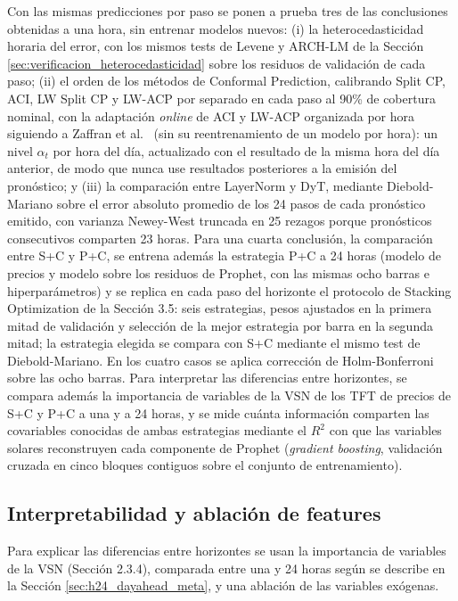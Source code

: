 Con las mismas predicciones por paso se ponen a prueba tres de las conclusiones obtenidas a una hora, sin entrenar modelos nuevos: (i) la heterocedasticidad horaria del error, con los mismos tests de Levene y ARCH-LM de la Sección \ref{sec:verificacion_heterocedasticidad} sobre los residuos de validación de cada paso; (ii) el orden de los métodos de Conformal Prediction, calibrando Split CP, ACI, LW Split CP y LW-ACP por separado en cada paso al 90\% de cobertura nominal, con la adaptación \textit{online} de ACI y LW-ACP organizada por hora siguiendo a Zaffran et al.\ \cite{ZaffranICML2022} (sin su reentrenamiento de un modelo por hora): un nivel $\alpha_t$ por hora del día, actualizado con el resultado de la misma hora del día anterior, de modo que nunca use resultados posteriores a la emisión del pronóstico; y (iii) la comparación entre LayerNorm y DyT, mediante Diebold-Mariano sobre el error absoluto promedio de los 24 pasos de cada pronóstico emitido, con varianza Newey-West truncada en 25 rezagos porque pronósticos consecutivos comparten 23 horas. Para una cuarta conclusión, la comparación entre S+C y P+C, se entrena además la estrategia P+C a 24 horas (modelo de precios y modelo sobre los residuos de Prophet, con las mismas ocho barras e hiperparámetros) y se replica en cada paso del horizonte el protocolo de Stacking Optimization de la Sección 3.5: seis estrategias, pesos ajustados en la primera mitad de validación y selección de la mejor estrategia por barra en la segunda mitad; la estrategia elegida se compara con S+C mediante el mismo test de Diebold-Mariano. En los cuatro casos se aplica corrección de Holm-Bonferroni sobre las ocho barras. Para interpretar las diferencias entre horizontes, se compara además la importancia de variables de la VSN de los TFT de precios de S+C y P+C a una y a 24 horas, y se mide cuánta información comparten las covariables conocidas de ambas estrategias mediante el $R^2$ con que las variables solares reconstruyen cada componente de Prophet (\textit{gradient boosting}, validación cruzada en cinco bloques contiguos sobre el conjunto de entrenamiento).

\subsection{Interpretabilidad y ablación de features}
\label{sec:ablacion_meta}

Para explicar las diferencias entre horizontes se usan la importancia de variables de la VSN (Sección 2.3.4), comparada entre una y 24 horas según se describe en la Sección \ref{sec:h24_dayahead_meta}, y una ablación de las variables exógenas.

